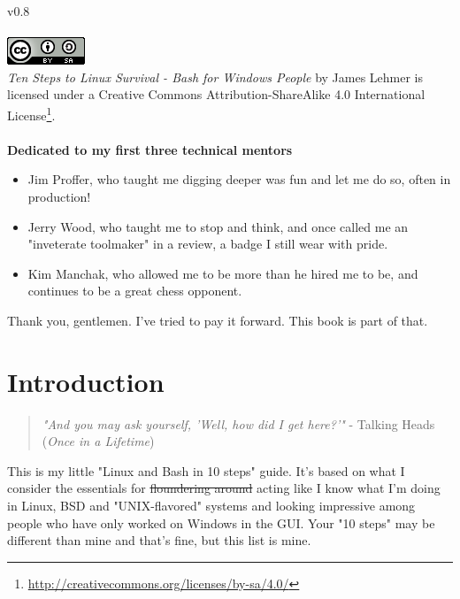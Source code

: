 \documentclass[10pt,american,]{book}
\renewcommand{\href}[2]{#2\footnote{\url{#1}}}
\numberwithin{figure}{chapter}
\begin{document}
 v0.8 ~\\
\hspace*{0.333em}\\
 \includegraphics{./images/cc-by-sa.png}\\
\emph{Ten Steps to Linux Survival - Bash for Windows People} by James
Lehmer is licensed under a
\href{http://creativecommons.org/licenses/by-sa/4.0/}{Creative Commons
Attribution-ShareAlike 4.0 International License}. ~\\
\hspace*{0.333em}\\
 \textbf{Dedicated to my first three technical mentors}

\begin{itemize}
\item
  Jim Proffer, who taught me digging deeper was fun and let me do so,
  often in production!
\item
  Jerry Wood, who taught me to stop and think, and once called me an
  "inveterate toolmaker" in a review, a badge I still wear with pride.
\item
  Kim Manchak, who allowed me to be more than he hired me to be, and
  continues to be a great chess opponent.
\end{itemize}

Thank you, gentlemen. I've tried to pay it forward. This book is part of
that.

\pagestyle{fancy} \fancyhead{}
\fancyhead[RO]{\slshape \leftmark} \renewcommand{\headrulewidth}{0.4pt}

\hypertarget{introduction}{\chapter{Introduction}\label{introduction}}

\begin{quote}
\emph{"And you may ask yourself, 'Well, how did I get here?'"} - Talking
Heads (\emph{Once in a Lifetime})
\end{quote}

This is my little "Linux and Bash in 10 steps" guide. It's based on what
I consider the essentials for \sout{floundering around} acting like I
know what I'm doing in Linux, BSD and "UNIX-flavored" systems and
looking impressive among people who have only worked on Windows in the
GUI. Your "10 steps" may be different than mine and that's fine, but
this list is mine.
\end{document}
